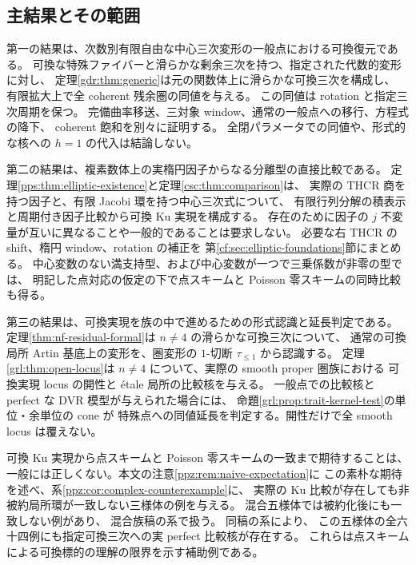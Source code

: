 \subsection{主結果とその範囲}

第一の結果は、次数別有限自由な中心三次変形の一般点における可換復元である。
可換な特殊ファイバーと滑らかな剰余三次を持つ、指定された代数的変形に対し、
定理\ref{gdr:thm:generic}は元の関数体上に滑らかな可換三次を構成し、
有限拡大上で全 coherent 残余圏の同値を与える。
この同値は rotation と指定三次周期を保つ。
完備曲率移送、三対象 window、通常の一般点への移行、方程式の降下、
coherent 飽和を別々に証明する。
全閉パラメータでの同値や、形式的な核への $h=1$ の代入は結論しない。

第二の結果は、複素数体上の実楕円因子からなる分離型の直接比較である。
定理\ref{pps:thm:elliptic-existence}と定理\ref{csc:thm:comparison}は、
実際の THCR 商を持つ因子と、有限 Jacobi 環を持つ中心三次式について、
有限行列分解の積表示と周期付き因子比較から可換 Ku 実現を構成する。
存在のために因子の $j$ 不変量が互いに異なることや一般的であることは要求しない。
必要な右 THCR の shift、楕円 window、rotation の補正を
第\ref{cf:sec:elliptic-foundations}節にまとめる。
中心変数のない満支持型、および中心変数が一つで三乗係数が非零の型では、
明記した点対応の仮定の下で点スキームと Poisson 零スキームの同時比較も得る。

第三の結果は、可換実現を族の中で進めるための形式認識と延長判定である。
定理\ref{thm:nf-residual-formal}は $n\ne4$ の滑らかな可換三次について、
通常の可換局所 Artin 基底上の変形を、圏変形の $1$-切断 $\tau_{\le1}$ から認識する。
定理\ref{grl:thm:open-locus}は $n\ne4$ について、実際の smooth proper 圏族における
可換実現 locus の開性と \'etale 局所の比較核を与える。
一般点での比較核と perfect な DVR 模型が与えられた場合には、
命題\ref{grl:prop:trait-kernel-test}の単位・余単位の cone が
特殊点への同値延長を判定する。開性だけで全 smooth locus は覆えない。

可換 Ku 実現から点スキームと Poisson 零スキームの一致まで期待することは、
一般には正しくない。本文の注意\ref{ppz:rem:naive-expectation}に
この素朴な期待を述べ、系\ref{ppz:cor:complex-counterexample}に、
実際の Ku 比較が存在しても非被約局所環が一致しない三様体の例を与える。
混合五様体では被約化後にも一致しない例があり、
混合族稿の系で扱う。
同稿の系により、
この五様体の全六十四例にも指定可換三次への実 perfect 比較核が存在する。
これらは点スキームによる可換標的の理解の限界を示す補助例である。

